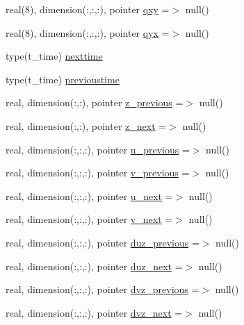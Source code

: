 \begin{DoxyCompactItemize}
real(8), dimension(\+:,\+:,\+:), pointer \mbox{\hyperlink{structmodulehydrodynamic_1_1t__submodel_a15bf0c7453d67ac2af11c2bf115cf854}{qxy}} =$>$ null()
\item 
real(8), dimension(\+:,\+:,\+:), pointer \mbox{\hyperlink{structmodulehydrodynamic_1_1t__submodel_ae07e31a35a710f5685d5f19d8b41e153}{qyx}} =$>$ null()
\item 
type(t\+\_\+time) \mbox{\hyperlink{structmodulehydrodynamic_1_1t__submodel_a6f724ca21eba6bb8dca1278defcfddfd}{nexttime}}
\item 
type(t\+\_\+time) \mbox{\hyperlink{structmodulehydrodynamic_1_1t__submodel_ab6557459861f588004311913a75a4a38}{previoustime}}
\item 
real, dimension(\+:,\+:), pointer \mbox{\hyperlink{structmodulehydrodynamic_1_1t__submodel_a38c8d2095dab0a8276c95fd16b6cfacf}{z\+\_\+previous}} =$>$ null()
\item 
real, dimension(\+:,\+:), pointer \mbox{\hyperlink{structmodulehydrodynamic_1_1t__submodel_a5c5a6d7c93033f8a180f9e5e9ccbd692}{z\+\_\+next}} =$>$ null()
\item 
real, dimension(\+:,\+:,\+:), pointer \mbox{\hyperlink{structmodulehydrodynamic_1_1t__submodel_a73f4019fd7066b909e03bfa61709522e}{u\+\_\+previous}} =$>$ null()
\item 
real, dimension(\+:,\+:,\+:), pointer \mbox{\hyperlink{structmodulehydrodynamic_1_1t__submodel_a616f0de88ca87de4a96437029c749b09}{v\+\_\+previous}} =$>$ null()
\item 
real, dimension(\+:,\+:,\+:), pointer \mbox{\hyperlink{structmodulehydrodynamic_1_1t__submodel_ad593ff9e3d2c0852a00e799a041bb6f4}{u\+\_\+next}} =$>$ null()
\item 
real, dimension(\+:,\+:,\+:), pointer \mbox{\hyperlink{structmodulehydrodynamic_1_1t__submodel_a5a3d04b55c1c55f4103cd7a89c813801}{v\+\_\+next}} =$>$ null()
\item 
real, dimension(\+:,\+:,\+:), pointer \mbox{\hyperlink{structmodulehydrodynamic_1_1t__submodel_a8692daa0e27bfaa56b95cb55044cd8d7}{duz\+\_\+previous}} =$>$ null()
\item 
real, dimension(\+:,\+:,\+:), pointer \mbox{\hyperlink{structmodulehydrodynamic_1_1t__submodel_ad8e17176714e28596942062188557e1f}{duz\+\_\+next}} =$>$ null()
\item 
real, dimension(\+:,\+:,\+:), pointer \mbox{\hyperlink{structmodulehydrodynamic_1_1t__submodel_aea04ee3c7cbb28462347fa8ae99e2a8f}{dvz\+\_\+previous}} =$>$ null()
\item 
real, dimension(\+:,\+:,\+:), pointer \mbox{\hyperlink{structmodulehydrodynamic_1_1t__submodel_aeca190c29a369f3a9fc6810a0a2f7855}{dvz\+\_\+next}} =$>$ null()

\end{DoxyCompactItemize}
